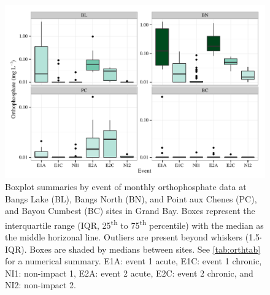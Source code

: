 \documentclass[letterpaper,12pt]{article}\usepackage[]{graphicx}\usepackage[]{color}
\makeatletter
\def\maxwidth{ %
  \ifdim\Gin@nat@width>\linewidth
    \linewidth
  \else
    \Gin@nat@width
  \fi
}
\makeatother
\begin{document}
\begin{figure}[!ht]

{\centering \includegraphics[width=\maxwidth]{figs/orthfig-1} 

}

\caption{Boxplot summaries by event of monthly orthophosphate data at Bangs Lake (BL), Bangs North (BN), and Point aux Chenes (PC), and Bayou Cumbest (BC) sites in Grand Bay.  Boxes represent the interquartile range (IQR, 25\textsuperscript{th} to 75\textsuperscript{th} percentile) with the median as the middle horizonal line.  Outliers are present beyond whiskers (1.5$\cdot$IQR). Boxes are shaded by medians between sites.  See \cref{tab:orthtab} for a numerical summary. E1A: event 1 acute, E1C: event 1 chronic, NI1: non-impact 1, E2A: event 2 acute, E2C: event 2 chronic, and NI2: non-impact 2.}\label{fig:orthfig}
\end{figure}


\clearpage
\end{document}

